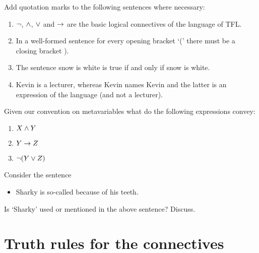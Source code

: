 \begin{practiceproblems}
\problempart
Add quotation marks to the following sentences where necessary:
\begin{enumerate}
\item {}$\neg$, $\mathbin{\wedge}$, $\vee$ and $\rightarrow$ are the basic logical connectives of the language of TFL.
\item In a well-formed sentence for every opening bracket `(' there must be a closing bracket ).
\item The sentence snow is white is true if and only if snow is white. 
\item Kevin is a lecturer, whereas Kevin names Kevin and the latter is an expression of the language (and not a lecturer).
\end{enumerate}

\problempart
Given our convention on metavariables what do the following expressions convey:
\begin{enumerate}
\item $X\mathbin{\wedge}Y$
\item $Y\rightarrow Z$
\item $\neg(Y\vee Z)$
\end{enumerate}

\problempart
Consider the sentence
\begin{itemize}
\item Sharky is so-called because of his teeth.
\end{itemize}
Is `Sharky' used or mentioned in the above sentence? Discuss.
\end{practiceproblems}





\chapter{Truth rules for the connectives}\label{sec:tt}

